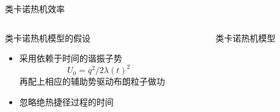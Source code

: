 \documentclass{beamer}
\begin{document}
\begin{frame}{类卡诺热机效率}
    \begin{columns}
        \begin{column}{.7\textwidth}
            \begin{exampleblock}{类卡诺热机模型的假设}
            \begin{itemize}
            \item<2-> 采用依赖于时间的谐振子势
            \begin{equation}
                U_0 = q^{2} / 2 \lambda(t)^2
                \label{eq32}
            \end{equation}
            再配上相应的辅助势驱动布朗粒子做功
            \item<3-> 忽略绝热捷径过程的时间 
            \end{itemize}
            \end{exampleblock}          
        \end{column}
        \begin{column}{.4\textwidth}
        \begin{figure}
            \centering
            \def\svgwidth{\columnwidth}
            
            \caption{类卡诺热机模型}
            \label{p3.1}
            \end{figure}
        \end{column}   
    \end{columns}
\end{frame}
\end{document}
